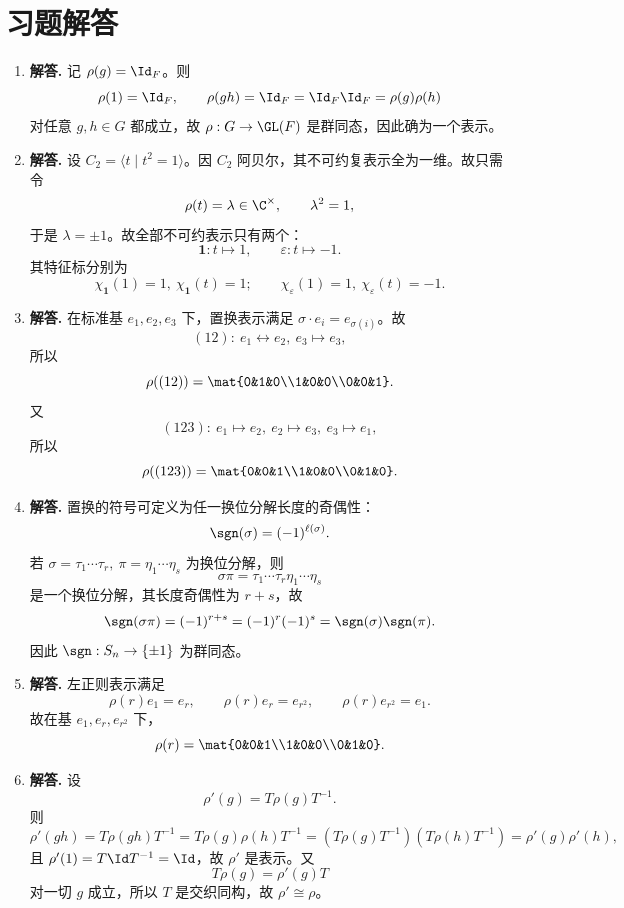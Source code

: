 \section*{习题解答}
\begin{enumerate}[label=\textbf{\arabic*.}, leftmargin=*, itemsep=1em]
\item \textbf{解答.} 记 $\rho(g)=\Id_F$。则
\[
\rho(1)=\Id_F,\qquad \rho(gh)=\Id_F=\Id_F\Id_F=\rho(g)\rho(h)
\]
对任意 $g,h\in G$ 都成立，故 $\rho:G\to \GL(F)$ 是群同态，因此确为一个表示。

\item \textbf{解答.} 设 $C_2=\langle t\mid t^2=1\rangle$。因 $C_2$ 阿贝尔，其不可约复表示全为一维。故只需令
\[
\rho(t)=\lambda\in \C^\times,\qquad \lambda^2=1,
\]
于是 $\lambda=\pm1$。故全部不可约表示只有两个：
\[
\mathbf{1}:t\mapsto 1,\qquad \varepsilon:t\mapsto -1.
\]
其特征标分别为
\[
\chi_{\mathbf{1}}(1)=1,\ \chi_{\mathbf{1}}(t)=1;\qquad
\chi_\varepsilon(1)=1,\ \chi_\varepsilon(t)=-1.
\]

\item \textbf{解答.} 在标准基 $e_1,e_2,e_3$ 下，置换表示满足 $\sigma\cdot e_i=e_{\sigma(i)}$。故
\[
(12):\ e_1\leftrightarrow e_2,\ e_3\mapsto e_3,
\]
所以
\[
\rho((12))=\mat{0&1&0\\1&0&0\\0&0&1}.
\]
又
\[
(123):\ e_1\mapsto e_2,\ e_2\mapsto e_3,\ e_3\mapsto e_1,
\]
所以
\[
\rho((123))=\mat{0&0&1\\1&0&0\\0&1&0}.
\]

\item \textbf{解答.} 置换的符号可定义为任一换位分解长度的奇偶性：
\[
\sgn(\sigma)=(-1)^{\ell(\sigma)}.
\]
若 $\sigma=\tau_1\cdots \tau_r,\ \pi=\eta_1\cdots \eta_s$ 为换位分解，则
\[
\sigma\pi=\tau_1\cdots \tau_r\eta_1\cdots \eta_s
\]
是一个换位分解，其长度奇偶性为 $r+s$，故
\[
\sgn(\sigma\pi)=(-1)^{r+s}=(-1)^r(-1)^s=\sgn(\sigma)\sgn(\pi).
\]
因此 $\sgn:S_n\to\{\pm1\}$ 为群同态。

\item \textbf{解答.} 左正则表示满足
\[
\rho(r)e_1=e_r,\qquad \rho(r)e_r=e_{r^2},\qquad \rho(r)e_{r^2}=e_1.
\]
故在基 $e_1,e_r,e_{r^2}$ 下，
\[
\rho(r)=\mat{0&0&1\\1&0&0\\0&1&0}.
\]

\item \textbf{解答.} 设
\[
\rho'(g)=T\rho(g)T^{-1}.
\]
则
\[
\rho'(gh)=T\rho(gh)T^{-1}=T\rho(g)\rho(h)T^{-1}
=(T\rho(g)T^{-1})(T\rho(h)T^{-1})
=\rho'(g)\rho'(h),
\]
且 $\rho'(1)=T\Id T^{-1}=\Id$，故 $\rho'$ 是表示。又
\[
T\rho(g)=\rho'(g)T
\]
对一切 $g$ 成立，所以 $T$ 是交织同构，故 $\rho'\cong \rho$。


\end{enumerate}
